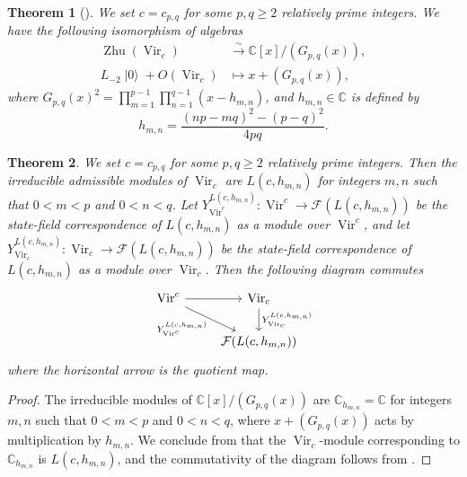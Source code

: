 \documentclass[a4paper, 12pt, reqno]{amsart}
\newtheorem{theorem}{Theorem}[section]
\theoremstyle{remark}
\numberwithin{equation}{subsection}
\DeclareMathOperator{\Vir}{Vir}
\DeclareMathOperator{\vac}{|0\rangle}
\DeclareMathOperator{\Zhu}{Zhu}
\begin{document}
\begin{theorem}[{\cite{wang_rationality_1993}}]
  \label{thr:42}
  We set $c = c_{p, q}$ for some $p, q \ge 2$ relatively prime integers.
  We have the following isomorphism of algebras
  \begin{align*}
    \Zhu(\Vir_c) &\xrightarrow{\sim} \mathbb{C}[x]/(G_{p, q}(x)), \\
    L_{-2}\vac + O(\Vir_c) &\mapsto x + (G_{p, q}(x)),
  \end{align*}
  where $G_{p ,q}(x)^2 = \prod_{m = 1}^{p - 1}\prod_{n = 1}^{q - 1}(x - h_{m, n})$, and $h_{m, n} \in \mathbb{C}$ is defined by
  \begin{equation}
    \label{eq:32}
    h_{m, n} = \frac{(np - mq)^2 - (p - q)^2}{4pq}.
  \end{equation}
\end{theorem}

\begin{theorem}
  \label{thr:43}
  We set $c = c_{p, q}$ for some $p, q \ge 2$ relatively prime integers.
  Then the irreducible admissible modules of $\Vir_c$ are $L(c, h_{m, n})$ for integers $m, n$ such that $0 < m < p$ and $0 < n < q$.
  Let $Y^{L(c, h_{m, n})}_{\Vir^c}: \Vir^c \to \mathcal{F}(L(c, h_{m, n}))$ be the state-field correspondence of $L(c, h_{m, n})$ as a module over $\Vir^c$, and let $Y^{L(c, h_{m, n})}_{\Vir_c}: \Vir_c \to \mathcal{F}(L(c, h_{m, n}))$ be the state-field correspondence of $L(c, h_{m, n})$ as a module over $\Vir_c$.
  Then the following diagram commutes
  \begin{equation*}
    \begin{tikzcd}
      \Vir^c \arrow[r] \arrow[rd, "{Y^{L(c, h_{m, n})}_{\Vir^c}}"'] & {\Vir_c} \arrow[d, "{Y^{L(c, h_{m, n})}_{\Vir_c}}"] \\
      & {\mathcal{F}(L(c, h_{m, n}))}
    \end{tikzcd}
  \end{equation*}
  where the horizontal arrow is the quotient map.
\end{theorem}

\begin{proof}
  The irreducible modules of $\mathbb{C}[x]/(G_{p, q}(x))$ are $\mathbb{C}_{h_{m, n}} = \mathbb{C}$ for integers $m, n$ such that $0 < m < p$ and $0 < n < q$, where $x + (G_{p, q}(x))$ acts by multiplication by $h_{m, n}$.
  We conclude from  that the $\Vir_c$-module corresponding to $\mathbb{C}_{h_{m, n}}$ is $L(c, h_{m, n})$, and the commutativity of the diagram follows from .
\end{proof}
\end{document}
